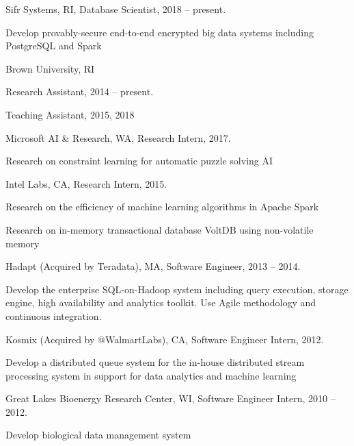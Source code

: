 \documentclass[letterpaper]{article}
\renewenvironment{itemize}{
  \begin{list}{}{
    \setlength{\leftmargin}{1.5em}
  }
}{
  \end{list}
}
\begin{document}
\begin{itemize}
\item Sifr Systems, RI, Database Scientist, 2018 -- present.
	\begin{itemize}
		\item Develop provably-secure end-to-end encrypted big data systems including PostgreSQL and 
		Spark
	\end{itemize}
\item Brown University, RI
	\begin{itemize}
		\item Research Assistant, 2014 -- present.
		\item Teaching Assistant, 2015, 2018
	\end{itemize}
\item Microsoft AI \& Research, WA, Research Intern, 2017.
	\begin{itemize}
		\item Research on constraint learning for automatic puzzle solving AI
	\end{itemize}
\item Intel Labs, CA, Research Intern, 2015.
	\begin{itemize}
		\item Research on the efficiency of machine learning algorithms in Apache Spark
		\item Research on in-memory transactional database VoltDB using non-volatile memory
	\end{itemize}
\item Hadapt (Acquired by Teradata), MA, Software Engineer, 2013 -- 2014.
	\begin{itemize}
		\item Develop the enterprise SQL-on-Hadoop system including query execution, storage engine, high availability and analytics toolkit.  Use Agile methodology and continuous integration.
	\end{itemize}
\item Kosmix (Acquired by @WalmartLabs), CA, Software Engineer Intern, 2012.
	\begin{itemize}
		\item Develop a distributed queue system for the in-house distributed stream processing system in support for data analytics and machine learning
	\end{itemize}
\item Great Lakes Bioenergy Research Center, WI, Software Engineer Intern, 2010 -- 2012.
	\begin{itemize}
		\item Develop biological data management system
	\end{itemize}
\end{itemize}
\end{document}
